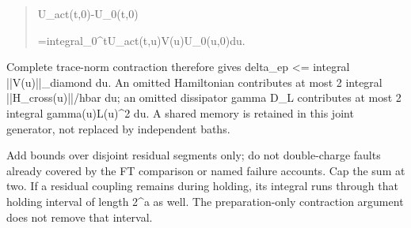 \documentclass[
]{article}
\begin{document}
\begin{itemize}
  \begin{quote}\small\ttfamily\raggedright\setlength{\parskip}{0pt}
  \noindent U\allowbreak{}\_\allowbreak{}a\allowbreak{}c\allowbreak{}t\allowbreak{}(\allowbreak{}t\allowbreak{},\allowbreak{}0\allowbreak{})\allowbreak{}-\allowbreak{}U\allowbreak{}\_\allowbreak{}0\allowbreak{}(\allowbreak{}t\allowbreak{},\allowbreak{}0\allowbreak{})\par
  \noindent \hspace*{0.525em}\allowbreak{}\hspace*{0.525em}\allowbreak{}=\allowbreak{}\hspace*{0.525em}\allowbreak{}i\allowbreak{}n\allowbreak{}t\allowbreak{}e\allowbreak{}g\allowbreak{}r\allowbreak{}a\allowbreak{}l\allowbreak{}\_\allowbreak{}0\allowbreak{}\^{}\allowbreak{}t\allowbreak{}\hspace*{0.525em}\allowbreak{}U\allowbreak{}\_\allowbreak{}a\allowbreak{}c\allowbreak{}t\allowbreak{}(\allowbreak{}t\allowbreak{},\allowbreak{}u\allowbreak{})\allowbreak{}\hspace*{0.525em}\allowbreak{}V\allowbreak{}(\allowbreak{}u\allowbreak{})\allowbreak{}\hspace*{0.525em}\allowbreak{}U\allowbreak{}\_\allowbreak{}0\allowbreak{}(\allowbreak{}u\allowbreak{},\allowbreak{}0\allowbreak{})\allowbreak{}\hspace*{0.525em}\allowbreak{}d\allowbreak{}u\allowbreak{}.\par
  \end{quote}

  Complete trace-norm contraction therefore gives delta\_ep \textless=
  integral
  |\allowbreak{}|\allowbreak{}V\allowbreak{}(\allowbreak{}u\allowbreak{})\allowbreak{}|\allowbreak{}|\allowbreak{}\_\allowbreak{}d\allowbreak{}i\allowbreak{}a\allowbreak{}m\allowbreak{}o\allowbreak{}n\allowbreak{}d
  du. An omitted Hamiltonian contributes at most 2 integral
  |\allowbreak{}|\allowbreak{}H\allowbreak{}\_\allowbreak{}c\allowbreak{}r\allowbreak{}o\allowbreak{}s\allowbreak{}s\allowbreak{}(\allowbreak{}u\allowbreak{})\allowbreak{}|\allowbreak{}|\allowbreak{}/\allowbreak{}h\allowbreak{}b\allowbreak{}a\allowbreak{}r
  du; an omitted dissipator gamma D\_L contributes at most 2 integral
  gamma(u)\textbar\textbar L(u)\textbar\textbar\^{}2 du. A shared memory
  is retained in this joint generator, not replaced by independent
  baths.
\end{itemize}

Add bounds over disjoint residual segments only; do not double-charge
faults already covered by the FT comparison or named failure accounts.
Cap the sum at two. If a residual coupling remains during holding, its
integral runs through that holding interval of length 2\^{}a as well.
The preparation-only contraction argument does not remove that interval.
\end{document}
